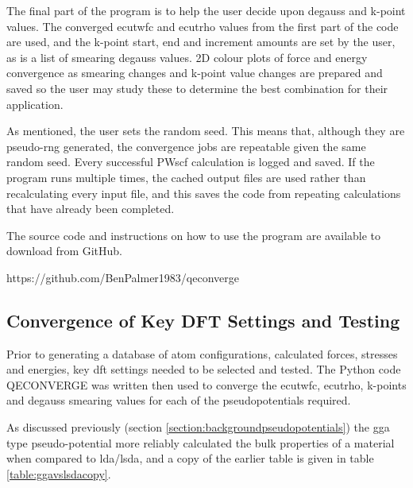 The final part of the program is to help the user decide upon degauss and k-point values.  The converged ecutwfc and ecutrho values from the first part of the code are used, and the k-point start, end and increment amounts are set by the user, as is a list of smearing degauss values.  2D colour plots of force and energy convergence as smearing changes and k-point value changes are prepared and saved so the user may study these to determine the best combination for their application.

As mentioned, the user sets the random seed.  This means that, although they are pseudo-rng generated, the convergence jobs are repeatable given the same random seed.  Every successful PWscf calculation is logged and saved.  If the program runs multiple times, the cached output files are used rather than recalculating every input file, and this saves the code from repeating calculations that have already been completed.

The source code and instructions on how to use the program are available to download from GitHub.

https://github.com/BenPalmer1983/qeconverge












\FloatBarrier
\subsection[DFT Parameter Convergence]{Convergence of Key DFT Settings and Testing}

Prior to generating a database of atom configurations, calculated forces, stresses and energies, key \acrshort{dft} settings needed to be selected and tested.  The Python code QECONVERGE was written then used to converge the ecutwfc, ecutrho, k-points and degauss smearing values for each of the pseudopotentials required.
  
As discussed previously (section \ref{section:backgroundpseudopotentials}) the \acrshort{gga} type pseudo-potential more reliably calculated the bulk properties of a material when compared to \acrshort{lda}/\acrshort{lsda}, and a copy of the earlier table is given in table \ref{table:ggavslsdacopy}.

